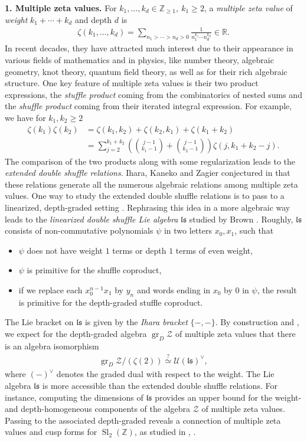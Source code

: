 \documentclass[12pt,reqno]{amsart}
\numberwithin{equation}{section}
\theoremstyle{definition}
\newcommand{\ZZ}{\mathbb{Z}}
\newcommand{\Z}{\mathcal{Z}}
\newcommand{\grDZ}{\operatorname{gr}_D\Z}
\newcommand{\ls}{\mathfrak{ls}}
\begin{document}
\textbf{1. Multiple zeta values.} For $k_1,\ldots,k_d\in \ZZ_{\geq1},\ k_1\geq2$, a \emph{multiple zeta value} of \emph{weight} $k_1+\cdots+k_d$ and depth $d$ is
\begin{align*}
\zeta(k_1,\ldots,k_d)=\sum_{n_1>\cdots>n_d>0} \frac{1}{n_1^{k_1}\cdots n_d^{k_d}} \in \mathbb{R}.
\end{align*}
In recent decades, they have attracted much interest due to their appearance in various fields of mathematics and in physics, like number theory, algebraic geometry, knot theory, quantum field theory, as well as for their rich algebraic structure. One key feature of multiple zeta values is their two product expressions, the \emph{stuffle product} coming from the combinatorics of nested sums and the \emph{shuffle product} coming from their iterated integral expression. For example, we have for $k_1,k_2\geq2$
\begin{align*}
\zeta(k_1)\zeta(k_2)&=\zeta(k_1,k_2)+\zeta(k_2,k_1)+\zeta(k_1+k_2) \\
&=\sum_{j=2}^{k_1+k_2}\left(\binom{j-1}{k_1-1}+\binom{j-1}{k_2-1}\right) \zeta(j,k_1+k_2-j).
\end{align*}
The comparison of the two products along with some regularization leads to the \emph{extended double shuffle relations}. Ihara, Kaneko and Zagier conjectured in \cite{IKZ06} that these relations generate all the numerous algebraic relations among multiple zeta values.
One way to study the extended double shuffle relations is to pass to a linearized, depth-graded setting \cite[Section 8]{IKZ06}. Rephrasing this idea in a more algebraic way leads to the \emph{linearized double shuffle Lie algebra} $\ls$ studied by Brown \cite{Bro21}. Roughly, $\ls$ consists of non-commutative polynomials $\psi$ in two letters $x_0,x_1$, such that
\begin{itemize}
\item[(i)] $\psi$ does not have weight $1$ terms or depth $1$ terms of even weight,
\item[(ii)] $\psi$ is primitive for the shuffle coproduct,
\item[(iii)] if we replace each $x_0^{n-1}x_1$ by $y_n$ and words ending in $x_0$ by $0$ in $\psi$, the result is primitive for the depth-graded stuffle coproduct.
\end{itemize}
The Lie bracket on $\ls$ is given by the \emph{Ihara bracket} $\{-,-\}$. By construction and \cite[Conjecture 1]{IKZ06}, we expect for the depth-graded algebra $\grDZ$ of multiple zeta values that there is an algebra isomorphism
\begin{align} \label{eq:iso_grZ_Uls}
\grDZ/(\zeta(2))\overset{?}{\simeq} \mathcal{U}(\ls)^\vee,
\end{align} 
where $(-)^\vee$ denotes the graded dual with respect to the weight.
The Lie algebra $\ls$ is more accessible than the extended double shuffle relations. For instance, computing the dimensions of $\ls$ provides an upper bound for the weight- and depth-homogeneous components of the algebra $\Z$ of multiple zeta values. Passing to the associated depth-graded reveals a connection of multiple zeta values and cusp forms for $\operatorname{Sl}_2(\ZZ)$, as studied in \cite{BK97}, \cite{Bro21}.
\end{document}

